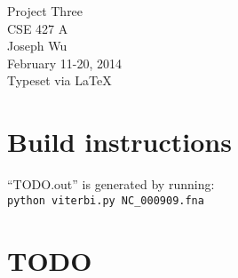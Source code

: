 \documentclass[a4paper, 12pt]{report}
\begin{document}
    \begin{center}
        {\LARGE Project Three} \\
        CSE 427 A \\
        Joseph Wu  \\
        February 11-20, 2014 \\
        {\tiny Typeset via \LaTeX}
    \end{center}

\section{Build instructions}
    ``TODO.out'' is generated by running: \\
    \texttt{python viterbi.py NC\_000909.fna}

\section{TODO}
    
    
\end{document}
